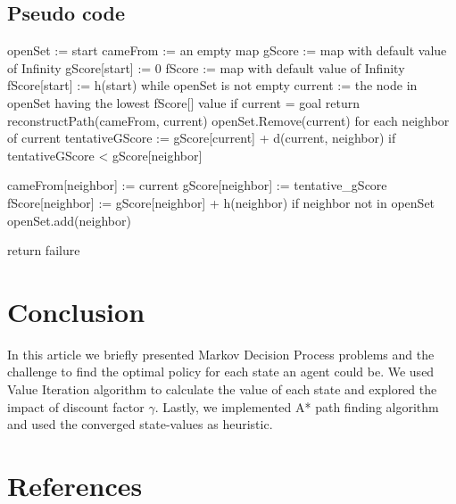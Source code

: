 \documentclass[10pt,a4paper,twocolumn]{article}
\begin{document}
	\subsection{Pseudo code}
	openSet := {start}
	\newline
	cameFrom := an empty map
	\newline
	gScore := map with default value of Infinity
	\newline
	gScore[start] := 0
	\newline
	fScore := map with default value of Infinity
	\newline
	fScore[start] := h(start)
	\newline
	 while openSet is not empty
	\newline
	current := the node in openSet having the lowest fScore[] value
		\newline
	if current = goal
		\newline
	return reconstructPath(cameFrom, current)
		\newline
	openSet.Remove(current)
		\newline
	for each neighbor of current
	\newline
	tentativeGScore := gScore[current] + d(current, neighbor)
		\newline
	if tentativeGScore < gScore[neighbor]
		\newline

	cameFrom[neighbor] := current
		\newline
	gScore[neighbor] := tentative_gScore
		\newline
	fScore[neighbor] := gScore[neighbor] + h(neighbor)
		\newline
	if neighbor not in openSet
		\newline
	openSet.add(neighbor)
		\newline

	return failure
	
	\section{Conclusion}
	In this article we briefly presented Markov Decision Process problems and the challenge to find the optimal policy for each state an agent could be. We used Value Iteration algorithm to calculate the value of each state and explored the impact of discount factor $\gamma$. Lastly, we implemented A* path finding algorithm and used the converged state-values as heuristic.
	\section{References}
	
\end{document}
